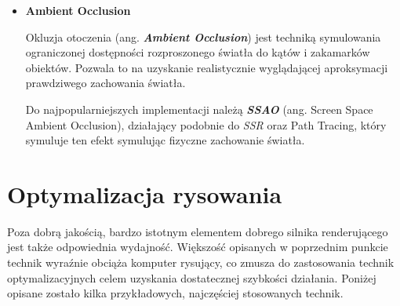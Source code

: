 \begin{itemize}
	\item \textbf{Ambient Occlusion}
	
	Okluzja otoczenia (ang. \emph{\textbf{Ambient Occlusion}}) jest techniką symulowania ograniczonej dostępności rozproszonego światła do kątów i zakamarków obiektów. Pozwala to na uzyskanie realistycznie wyglądającej aproksymacji prawdziwego zachowania światła.

	Do najpopularniejszych implementacji należą \emph{\textbf{SSAO}} (ang. Screen Space Ambient Occlusion), działający podobnie do \emph{SSR} oraz Path Tracing, który symuluje ten efekt symulując fizyczne zachowanie światła.
\end{itemize}

\section{Optymalizacja rysowania}

Poza dobrą jakością, bardzo istotnym elementem dobrego silnika renderującego jest także odpowiednia wydajność. Większość opisanych w poprzednim punkcie technik wyraźnie obciąża komputer rysujący, co zmusza do zastosowania technik optymalizacyjnych celem uzyskania dostatecznej szybkości działania. Poniżej opisane zostało kilka przykładowych, najczęściej stosowanych technik.

